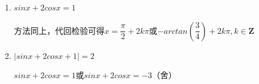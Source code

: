 \begin{enumerate}
\begin{enumerate}
\begin{enumerate}
\begin{jieda}
\begin{dingautolist}{172}
                    $2cosx = 1 - sinx$，$4 cos^2x = 1 - 2sinx + sin^2x$，$5sin^2x - 2sinx - 3 = 0$

                    $sinx = 1$或$-\dfrac{3}{5}$，代回检验可得$\left\{\begin{array}{l}
                        sinx = 1 \\
                        cosx = 0
                    \end{array}\right.$或$\left\{\begin{array}{l}
                        sinx = -\dfrac{3}{5} \\
                        cosx = \dfrac{4}{5}
                    \end{array}\right.$

                    $sinx + 1 = -2cosx$，$4 cos^2x = 1 + 2sinx + sin^2x$，$5sin^2x + 2sinx - 3 = 0$

                    $sinx = -1$或$\dfrac{3}{5}$，代回检验可得$\left\{\begin{array}{l}
                        sinx = -1 \\
                        cosx = 0
                    \end{array}\right.$或$\left\{\begin{array}{l}
                        sinx = \dfrac{3}{5} \\
                        cosx = -\dfrac{4}{5}
                    \end{array}\right.$

                    综上，$x = \dfrac{\pi}{2}+k\pi$或$-arcsin\left(\dfrac{3}{5}\right) + 2k\pi$或$\pi-arcsin\left(\dfrac{3}{5}\right) + 2k\pi, k \in \mathbf{Z}$
                \end{dingautolist}

            \end{jieda}
            \item $sinx + 2cosx = 1$
            \begin{jieda}
                方法同上，代回检验可得$x = \dfrac{\pi}{2}+2k\pi$或$-arctan\left(\dfrac{3}{4}\right)+2k\pi, k \in \mathbf{Z}$
            \end{jieda}
            \item $|sinx + 2cosx +1| = 2$
            \begin{jieda}
                $sinx + 2cosx = 1$或$sinx+2cosx = -3$（舍）


\end{jieda}
\end{enumerate}
\end{enumerate}
\end{enumerate}
